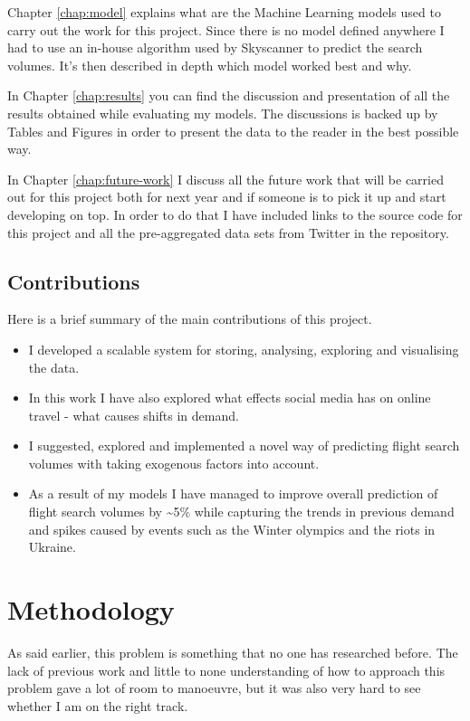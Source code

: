 \documentclass[minf,twoside,singlespacing,parskip,frontabs]{infthesis}
\begin{document}
Chapter \ref{chap:model} explains what are the Machine Learning models used to carry out the work for this project. Since there is no model defined anywhere I had to use an in-house algorithm used by Skyscanner to predict the search volumes. It's then described in depth which model worked best and why. 


In Chapter \ref{chap:results} you can find the discussion and presentation of all the results obtained while evaluating my models. The discussions is backed up by Tables and Figures in order to present the data to the reader in the best possible way.


In Chapter \ref{chap:future-work} I discuss all the future work that will be carried out for this project both for next year and if someone is to pick it up and start developing on top. In order to do that I have included links to the source code for this project and all the pre-aggregated data sets from Twitter in the repository.

\section{Contributions}

Here is a brief summary of the main contributions of this project.
\begin{itemize}
\item I developed a scalable system for storing, analysing, exploring and visualising the data.
\item In this work I have also explored what effects social media has on online travel - what causes shifts in demand.
\item I suggested, explored and implemented a novel way of predicting flight search volumes with taking exogenous factors into account.
\item As a result of my models I have managed to improve overall prediction of flight search volumes by \textasciitilde 5\% while capturing the trends in previous demand and spikes caused by events such as the Winter olympics and the riots in Ukraine. 
\end{itemize}


\chapter{Methodology}
\label{chap:method}


As said earlier, this problem is something that no one has researched before. The lack of previous work and little to none understanding of how to approach this problem gave a lot of room to manoeuvre, but it was also very hard to see whether I am on the right track.
\end{document}
